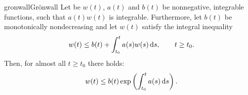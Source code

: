 \begin{Lemma*}{gronwall}{Grönwall}
  Let be $w(t)$, $a(t)$ and $b(t)$ be nonnegative, integrable
  functions, such that $a(t)w(t)$ is integrable. Furthermore, let
  $b(t)$ be monotonically nondecreasing and let $w(t)$ satisfy the
  integral inequality
  \begin{gather}
    \label{eq:IVP:10}
    w(t) \le b(t) + \int_{t_0}^t a(s)w(s)\,\mathrm{d} s,\qquad t\ge t_0.
  \end{gather}
  Then, for almost all $t \ge t_0$ there holds:
  \begin{gather}
    \label{eq:IVP:11}
    w(t) \le b(t) \exp\left( \int_{t_0}^t  a(s) \,\mathrm{d} s\right).
  \end{gather}
\end{Lemma*}

